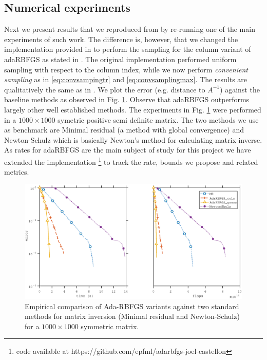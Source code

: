 \documentclass[12pt,conference,compsocconf]{IEEEtran}
\begin{document}
\vspace{-8mm}
\subsection{Numerical experiments}
Next we present results that we reproduced from \cite{Gower1} by re-running one of the main experiments of such work. The difference is, however, that we changed the implementation provided in \cite{Gowercode} to perform the sampling for the column variant of adaRBFGS as stated in \cite{Gower1}. The original implementation performed uniform sampling with respect to the column index, while we now perform \textit{convenient sampling} as in \eqref{eq:convsampingtr} and \eqref{eq:convsamplingmax}. The results are qualitatively the same as in \cite{Gower1}. We plot the error (e.g. distance to $A^{-1}$) against the baseline methods as observed in Fig. \ref{fig:comparison}. Observe that adaRBFGS outperforms largely other well established methods. The experiments in Fig. \ref{fig:comparison} were performed in a $1000\times1000$ symetric positive semi definite matrix. The two methods we use as benchmark are Minimal residual (a method with global convergence) and Newton-Schulz which is basically Newton's method for calculating matrix inverse. As rates for adaRBFGS are the main subject of study for this project we have extended the implementation \footnote{code available at https://github.com/epfml/adarbfgs-joel-castellon} to track the rate, bounds we propose and related metrics.
\begin{figure}
  \centering
  \includegraphics[height=0.7\columnwidth,width=1.1\columnwidth]{benchmark.eps}
  
  \vspace{-2mm}
  \caption{Empirical comparison of Ada-RBFGS variants against two standard methods for matrix inversion (Minimal residual and Newton-Schulz) for a $1000\times1000$ symmetric matrix.\label{fig:comparison}}
\end{figure}
\end{document}
